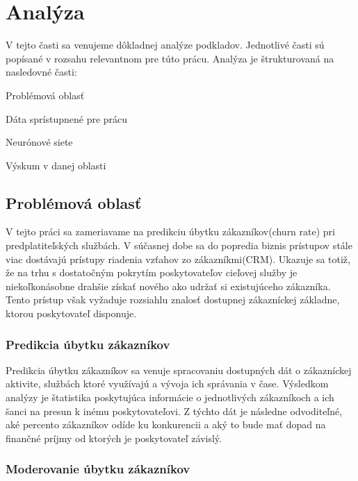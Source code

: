 \newpage
\chapter{Analýza}
\label{ch:Analýza}
V tejto časti sa venujeme dôkladnej analýze podkladov. Jednotlivé časti sú popísané v rozsahu relevantnom pre túto prácu. Analýza je štrukturovaná na nasledovné časti:

\begin{my_itemize}
	\item {Problémová oblasť}
	\item {Dáta sprístupnené pre prácu}
	\item {Neurónové siete}
	\item {Výskum v danej oblasti}
\end{my_itemize}

\section{Problémová oblasť}
\label{analyza_problemova_oblast}

V tejto práci sa zameriavame na predikciu úbytku zákazníkov(churn rate) pri predplatiteľských službách. V súčasnej dobe sa do popredia biznis prístupov stále viac dostávajú prístupy riadenia vzťahov zo zákazníkmi(CRM). Ukazuje sa totiž, že na trhu s dostatočným pokrytím poskytovateľov cieľovej služby je niekoľkonásobne drahšie získať nového ako udržať si existujúceho zákazníka. Tento prístup však vyžaduje rozsiahlu znalosť dostupnej zákazníckej základne, ktorou poskytovateľ disponuje. \newline

\subsection{Predikcia úbytku zákazníkov}
\label{analyza_ubytok_zakaznikov}

Predikcia úbytku zákazníkov sa venuje spracovaniu dostupných dát o zákazníckej aktivite, službách ktoré využívajú a vývoja ich správania v čase. Výsledkom analýzy je štatistika poskytujúca informácie o jednotlivých zákazníkoch a ich šanci na presun k inému poskytovateľovi. Z týchto dát je následne odvoditeľné, aké percento zákazníkov odíde ku konkurencii a aký to bude mať dopad na finančné príjmy od ktorých je poskytovateľ závislý. 

\subsection{Moderovanie úbytku zákazníkov}
\label{analyza_moderovanie_ubytku}


